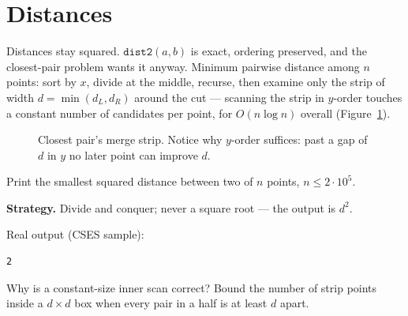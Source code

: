 \section{Distances}\label{sec:dist}
Distances stay squared. $\texttt{dist2}(a,b)$ is exact, ordering
preserved, and the closest-pair problem wants it anyway.
Minimum pairwise distance among $n$ points: sort by $x$, divide
at the middle, recurse, then examine only the strip of width
$d=\min(d_L,d_R)$ around the cut --- scanning the strip in
$y$-order touches a constant number of candidates per point, for
$O(n\log n)$ overall (Figure~\ref{fig:strip}).
\begin{figure}[ht]\centering

\caption{Closest pair's merge strip. Notice why $y$-order
suffices: past a gap of $d$ in $y$ no later point can improve
$d$.}
\label{fig:strip}
\end{figure}
\begin{example}\label{ex:mindist}
Print the smallest squared distance between two of $n$ points,
$n\le 2\cdot10^5$.
\par\smallskip
\textbf{Strategy.} Divide and conquer; never a square root ---
the output is $d^2$.
\par\smallskip
\begin{solution}

Real output (CSES sample):
\begin{lstlisting}[numbers=none]
2
\end{lstlisting}
\end{solution}
\end{example}
\begin{exercise}[medium]\label{exr:strip}
Why is a constant-size inner scan correct? Bound the number of
strip points inside a $d\times d$ box when every pair in a half
is at least $d$ apart.
\end{exercise}


